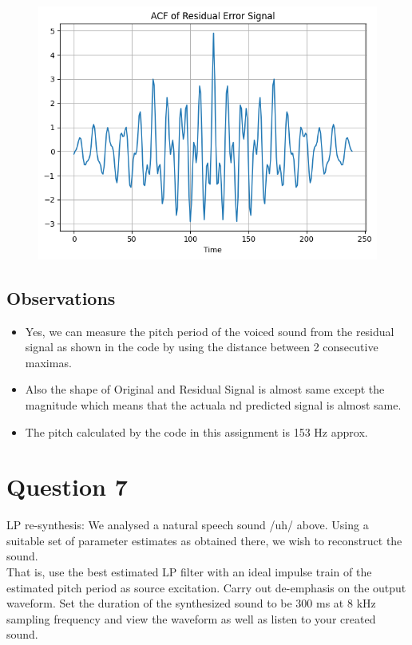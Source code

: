 \documentclass{article}
\begin{document}
\begin{figure}[H]
\begin{center}
\includegraphics[scale = 0.8]{acf_err.png}
\end{center}
\end{figure}

\subsection{Observations}
\begin{itemize}
\item Yes, we can measure the pitch period of the voiced sound from the residual signal as shown in the code by using the distance between 2 consecutive maximas.
\item Also the shape of Original and Residual Signal is almost same except the magnitude which means that the actuala nd predicted signal is almost same.
\item The pitch calculated by the code in this assignment is 153 Hz approx.
\end{itemize}

\section{Question 7}
LP re-synthesis: We analysed a natural speech sound /uh/ above. Using a suitable set of parameter estimates as obtained there, we wish to reconstruct the sound.\\

That is, use the best estimated LP filter with an ideal impulse train of the estimated pitch period as source excitation. Carry out de-emphasis on the output waveform. Set the duration of the synthesized sound to be 300 ms at 8 kHz sampling frequency and view the waveform as well as listen to your created sound.\\
\end{document}
